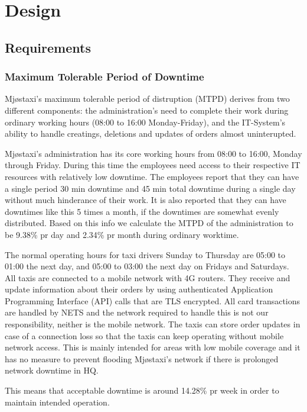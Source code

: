 \chapter{Design}
\label{chap:design}

\section{Requirements}\label{sec:reqirements}
\subsection{Maximum Tolerable Period of Downtime}
Mjøstaxi's maximum tolerable period of distruption (MTPD) derives from two different components: the administration's need to complete their work during ordinary working hours (08:00 to 16:00 Monday-Friday),
and the IT-System's ability to handle creatings, deletions and updates of orders almost uninterupted.

Mjøstaxi's administration has its core working hours from 08:00 to 16:00, Monday through Friday.
During this time the employees need access to their respective IT resources with relatively low downtime.
The employees report that they can have a single period 30 min downtime and 45 min total downtime during a single day without much hinderance of their work.
It is also reported that they can have downtimes like this 5 times a month, if the downtimes are somewhat evenly distributed.
Based on this info we calculate the MTPD of the administration to be 9.38\% pr day and 2.34\% pr month during ordinary worktime.


The normal operating hours for taxi drivers Sunday to Thursday are 05:00 to 01:00 the next day, and 05:00 to 03:00 the next day on Fridays and Saturdays.
All taxis are connected to a mobile network with 4G routers.
They receive and update information about their orders by using authenticated Application Programming Interface (API) calls that are TLS encrypted.
All card transactions are handled by NETS and the network required to handle this is not our responsibility, neither is the mobile network.
The taxis can store order updates in case of a connection loss so that the taxis can keep operating without mobile network access.
This is mainly intended for areas with low mobile coverage and it has no measure to prevent flooding Mjøstaxi's network if there is prolonged network downtime in HQ.

This means that acceptable downtime is around 14.28\% pr week in order to maintain intended operation.

